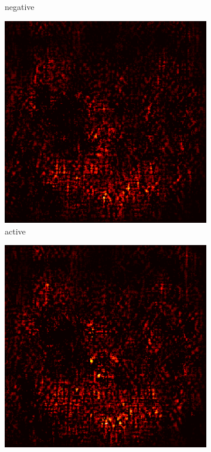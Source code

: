 \documentclass[preprint,12pt]{elsarticle}
\begin{document}
\begin{figure}
\begin{subfigure}{0.14\textwidth}
        \caption{negative}
    \end{subfigure}
    \hfill
    \begin{subfigure}{0.14\textwidth}
        \centering
        \includegraphics[width=\linewidth]{../visualizations/examples/imagenette/resnet18/active_saliency_map/6.png}
        \caption{active}
    \end{subfigure}
    \hfill
    \begin{subfigure}{0.14\textwidth}
        \centering
        \includegraphics[width=\linewidth]{../visualizations/examples/imagenette/resnet18/inactive_saliency_map/6.png}

\end{subfigure}
\end{figure}
\end{document}
